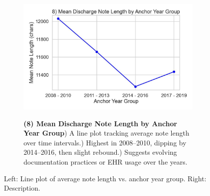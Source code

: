 \documentclass[12pt,a4paper]{report}
\begin{document}
\begin{figure}[ht!]
    \centering
    \begin{subfigure}{0.42\textwidth}
        \includegraphics[width=\linewidth]{mimic_plots/plot8.jpg}
    \end{subfigure}\hfill
    \begin{subfigure}{0.54\textwidth}
        \footnotesize
        \textbf{(8) Mean Discharge Note Length by Anchor Year Group}) A line plot tracking average note length over time intervals.) Highest in 2008--2010, dipping by 2014--2016, then slight rebound.) Suggests evolving documentation practices or EHR usage over the years.
    \end{subfigure}
    \caption{Left: Line plot of average note length vs. anchor year group. Right: Description.}
    \label{fig:plot8}
\end{figure}
\end{document}
